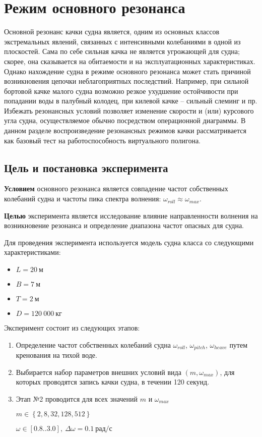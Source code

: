 \section{Режим основного резонанса}

Основной резонанс качки судна является, одним из основных классов экстремальных явлений, связанных с интенсивными колебаниями в одной из плоскостей. Сама по себе сильная качка не является угрожающей для судна; скорее, она сказывается на обитаемости и на эксплуатационных характеристиках. Однако нахождение судна в режиме основного резонанса может стать причиной возникновения цепочки неблагоприятных последствий. Например, при сильной бортовой качке малого судна возможно резкое ухудшение остойчивости при попадании воды в палубный колодец, при килевой качке – сильный слеминг и пр. Избежать резонансных условий позволяет изменение скорости и (или) курсового угла судна, осуществляемое обычно посредством операционной диаграммы. В данном разделе воспроизведение резонансных режимов качки рассматривается как базовый тест на работоспособность виртуального полигона.

\subsection{Цель и постановка эксперимента}

\textbf{Условием} основного резонанса является совпадение частот собственных колебаний судна и частоты пика спектра волнения: $\omega_{roll} \approx \omega_{max}$.

\textbf{Целью} эксперимента является исследование влияние направленности волнения на возникновение резонанса и определение диапазона частот опасных для судна.

Для проведения эксперимента используется модель судна класса  со следующими характеристиками:
\begin{itemize}
	\item	$L = 20\ \text{м}$
	\item	$B = 7\ \text{м}$
	\item	$T = 2\ \text{м}$
	\item	$D = 120\ 000\ \text{кг}$
\end{itemize}

Эксперимент состоит из следующих этапов:
\begin{enumerate}
	\item	Определение частот собственных колебаний судна 
			$\omega_{roll}$, $\omega_{pitch}$, $\omega_{heave}$ путем кренования на тихой воде.
	\item	Выбирается набор параметров внешних условий вида $(m, \omega_{max})$, для которых
			проводятся запись качки судна, в течении 120 секунд.
	\item	Этап №2	проводится для всех значений $m$ и $\omega_{max}$
	
			$m \in \left\lbrace 2,8,32,128,512 \right\rbrace$
			
			$\omega \in [0.8..3.0],\ \Delta\omega=0.1\ \text{рад/с}$ 

\end{enumerate}

